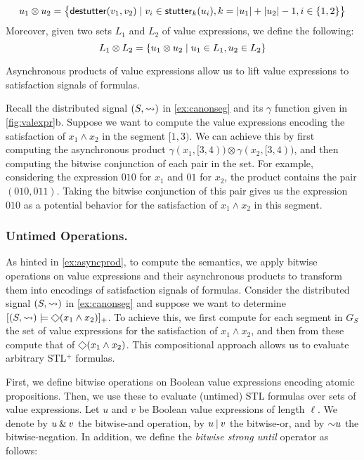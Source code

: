 \small
\[ u_1 \otimes u_2 = \big\{ \destutter(v_1, v_2) \st v_i \in \stutter_k(u_i), k = |u_1| + |u_2| - 1, i \in 
\{1,2\} \big\} \]  
\normalsize
Moreover, given two sets $L_1$ and $L_2$ of value expressions, we define the following: 
\small
\[ L_1 \otimes L_2 = \{ u_1 \otimes u_2 \st u_1 \in L_1, u_2 \in L_2 \} \]  
\normalsize

Asynchronous products of value expressions allow us to lift value expressions to satisfaction signals of formulas.

\begin{example} \label{ex:asyncprod}
	Recall the distributed signal $(S, {\rightsquigarrow})$ in \cref{ex:canonseg} and its $\gamma$ function given in \cref{fig:valexpr}b.
	Suppose we want to compute the value expressions encoding the satisfaction of $x_1 \land x_2$ in the segment $[1,3)$.
	We can achieve this by first computing the asynchronous product $\gamma(x_1, [3,4)) \otimes \gamma(x_2, [3,4))$, and then computing the bitwise conjunction of each pair in the set.
	For example, considering the expression $0  1  0$ for $x_1$ and $0  1$ for $x_2$, the product contains the pair $(010, 011)$.
	Taking the bitwise conjunction of this pair gives us the expression $0  1  0$ as a potential behavior for the satisfaction of $x_1 \land x_2$ in this segment.
\end{example}

\subsubsection{Untimed Operations.}
As hinted in \cref{ex:asyncprod}, to compute the semantics, we apply bitwise operations on value expressions and their asynchronous products to transform them into encodings of satisfaction signals of formulas.
Consider the distributed signal $(S, {\rightsquigarrow})$ in \cref{ex:canonseg} and suppose we want to determine 
$[(S, {\hb}) \models \LTLeventually (x_1 \land x_2)]_+$.
To achieve this, we first compute for each segment in $G_S$ the set of value expressions for the satisfaction of $x_1 \land x_2$, and then from these compute that of $\LTLeventually (x_1 \land x_2)$.
This compositional approach allows us to evaluate arbitrary STL$^+$ formulas.

First, we define bitwise operations on Boolean value expressions encoding atomic propositions.
Then, we use these to evaluate (untimed) STL formulas over sets of value expressions.
%
Let $u$ and $v$ be Boolean value expressions of length $\ell$.
We denote by $u \mathbin{\&} v$ the bitwise-and operation, by $u \mathbin{|} v$ the bitwise-or, and by $\mathord{\sim} u$ the bitwise-negation.
In addition, we define the \emph{bitwise strong until} operator as follows:

